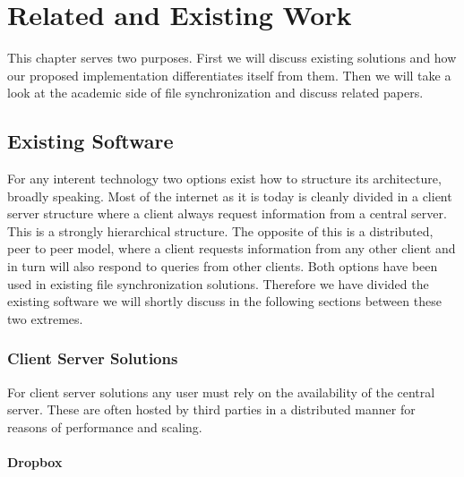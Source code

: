 \chapter{Related and Existing Work}
\label{chap:related}

This chapter serves two purposes.
First we will discuss existing solutions and how our proposed implementation differentiates itself from them.
Then we will take a look at the academic side of file synchronization and discuss related papers.

\section{Existing Software}

For any interent technology two options exist how to structure its architecture, broadly speaking.
Most of the internet as it is today is cleanly divided in a client server structure where a client always request information from a central server.
This is a strongly hierarchical structure.
The opposite of this is a distributed, peer to peer model, where a client requests information from any other client and in turn will also respond to queries from other clients.
Both options have been used in existing file synchronization solutions.
Therefore we have divided the existing software we will shortly discuss in the following sections between these two extremes.

\subsection{Client Server Solutions}

For client server solutions any user must rely on the availability of the central server.
These are often hosted by third parties in a distributed manner for reasons of performance and scaling.

\subsubsection{Dropbox}


